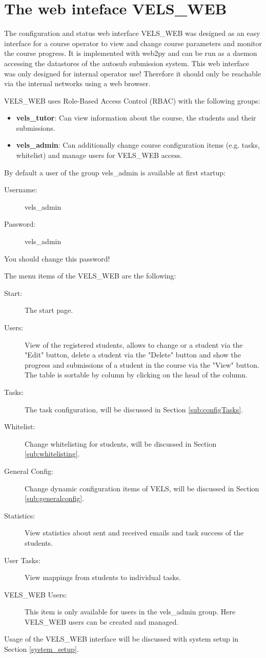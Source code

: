 \section{The web inteface VELS\_WEB} \label{VELS_WEB}

The configuration and status web interface VELS\_WEB was designed as an easy interface
for a course operator to view and change course parameters and monitor the course progress.
It is implemented with web2py and can be run as a daemon accessing the datastores of the
autosub submission system. This web interface was only
designed for internal operator use! Therefore it should only be reachable via
the internal networks using a web browser.

VELS\_WEB uses Role-Based Access Control (RBAC) with the following groups:
\begin{itemize}
\item \textbf{vels\_tutor}: Can view information about the course, the students
and their submissions.
\item \textbf{vels\_admin}: Can additionally change course configuration items
(e.g. tasks, whitelist) and manage users for VELS\_WEB access.
\end{itemize}

By default a user of the group vels\_admin is available at first startup:
\begin{description}
\item [Username:] vels\_admin
\item [Password:] vels\_admin
\end{description}
You should change this password!
\vspace{0.5cm}

The menu items of the VELS\_WEB are the following:
\begin{description}
\item [Start:] The start page.
\item [Users:] View of the registered students, allows to change or a student via the
    "Edit" button, delete a student via the "Delete" button  and show the
	progress and submissions of a student in the course via the "View" button. The table is sortable by column by
    clicking on the head of the column.
\item [Tasks:] The task configuration, will be discussed in Section \ref{sub:configTasks}.
\item [Whitelist:] Change whitelisting for students, will be discussed in Section
    \ref{sub:whitelisting}.
\item [General Config:] Change dynamic configuration items of VELS, will be discussed in
    Section \ref{sub:generalconfig}.
\item [Statistics:] View statistics about sent and received emails and task success of
    the students.
\item [User Tasks:] View mappings from students to individual tasks.
\item [VELS\_WEB Users:] This item is only available for users in the vels\_admin
group. Here VELS\_WEB users can be created and managed.
\end{description}

Usage of the VELS\_WEB interface will be discussed with system setup in Section \ref{system_setup}.
